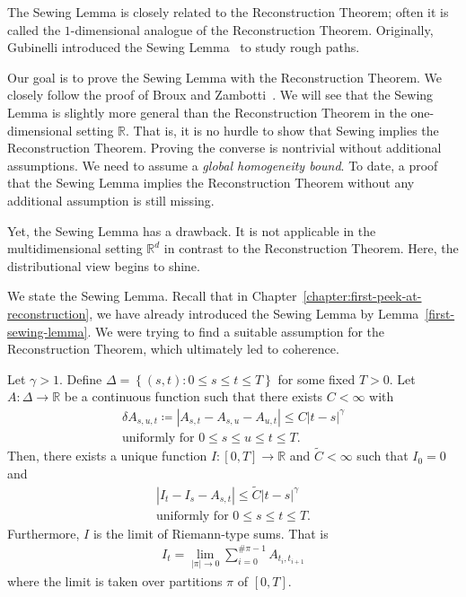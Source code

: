 The Sewing Lemma is closely related to the Reconstruction Theorem; often it is called the \( 1 \)-dimensional analogue of the Reconstruction Theorem. Originally, Gubinelli introduced the Sewing Lemma~\cite{gubinelli2004controlling} to study rough paths.

Our goal is to prove the Sewing Lemma with the Reconstruction Theorem. We closely follow the proof of Broux and Zambotti~\cite[Chapter 5]{broux2021sewing}. We will see that the Sewing Lemma is slightly more general than the Reconstruction Theorem in the one-dimensional setting \( \mathbb{R} \). That is, it is no hurdle to show that Sewing implies the Reconstruction Theorem. Proving the converse is nontrivial without additional assumptions. We need to assume a \emph{global homogeneity bound}. To date, a proof that the Sewing Lemma implies the Reconstruction Theorem without any additional assumption is still missing. 

Yet, the Sewing Lemma has a drawback. It is not applicable in the multidimensional setting \( \mathbb{R}^d \) in contrast to the Reconstruction Theorem. Here, the distributional view begins to shine.

We state the Sewing Lemma. Recall that in Chapter~\ref{chapter:first-peek-at-reconstruction}, we have already introduced the Sewing Lemma by Lemma~\ref{first-sewing-lemma}. We were trying to find a suitable assumption for the Reconstruction Theorem, which ultimately led to coherence.

\begin{lemma}
  Let \(\gamma > 1\). Define \( \Delta = \left \{ (s,t) :  0 \leq s \leq t \leq T\right \} \) for some fixed \(T > 0\). Let \(A: \Delta \to \mathbb{R}\) be a continuous function such that there exists \( C <\infty \) with
  \begin{gather*}
      \delta A_{s,u,t} \coloneqq |A_{s,t} - A_{s,u} - A_{u,t}| \leq C  {|t-s|}^\gamma \\
      \text{uniformly for \(0 \leq s \leq u \leq t \leq T\)}. \nonumber
  \end{gather*} 
  Then, there exists a unique function \(I: [0,T] \to \mathbb{R}\) and \(\tilde C < {\infty}\)  such that \(I_0 = 0\) and 
  \begin{gather*}
      |I_t - I_s - A_{s,t}| \leq \tilde C|t-s|^\gamma \\
      \text{uniformly for \(0 \leq s \leq t \leq T\).}
  \end{gather*}  
  Furthermore, \(I\) is the limit of Riemann-type sums. That is 
  \begin{align*}
    I_t =  \lim\limits_{|\pi| \to 0} \sum\limits_{i=0}^{\# \pi - 1} A_{t_i,t_{i+1}}
  \end{align*}
  where the limit is taken over partitions \( \pi \) of \( [0,T] \).
\end{lemma}

